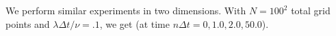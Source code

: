 \documentclass[12pt]{article}
\begin{document}

We perform similar experiments in two dimensions. With $N = 100^2$ total grid points and $\lambda \Delta t/\nu = .1$, we get (at time $n\Delta t = 0, 1.0, 2.0, 50.0$).
\begin{figure}[H]
\end{figure}
\begin{figure}[H]
\end{figure}
\end{document}
